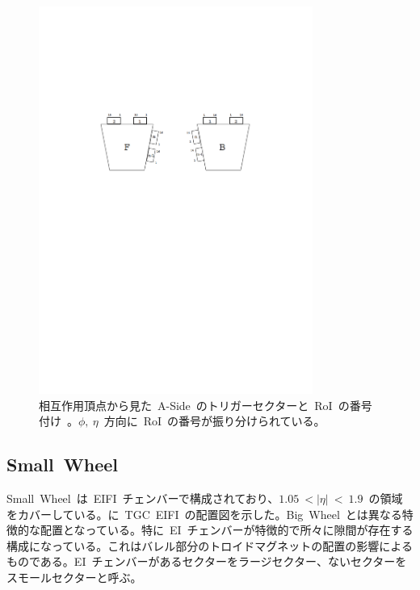 \begin{figure}[H]
        \centering   
        \includegraphics[width=0.8\textwidth,page=8]{img/pdf/TGC.pdf}
        \caption[トリガーセクターと~RoI~の番号付け]{相互作用頂点から見た~A-Side~のトリガーセクターと~RoI~の番号付け~\cite{TR:02}。$\phi,~\eta$~方向に~RoI~の番号が振り分けられている。}
        \label{fig:tgcsector}
\end{figure}

\subsection{Small~Wheel}
Small~Wheel~は~EIFI~チェンバーで構成されており、$1.05~<|\eta|~<~1.9$~の領域をカバーしている。に~TGC~EIFI~の配置図を示した。Big~Wheel~とは異なる特徴的な配置となっている。特に~EI~チェンバーが特徴的で所々に隙間が存在する構成になっている。これはバレル部分のトロイドマグネットの配置の影響によるものである。EI~チェンバーがあるセクターをラージセクター、ないセクターをスモールセクターと呼ぶ。

